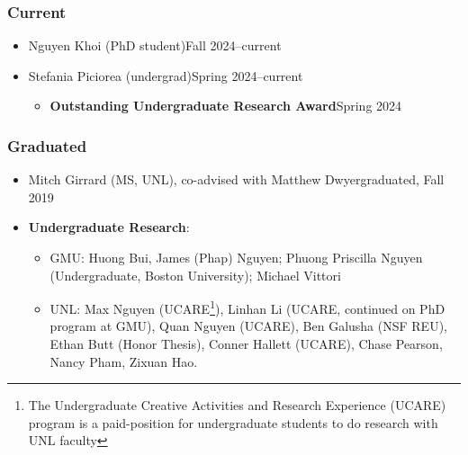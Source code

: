 \documentclass[11pt]{article}
\begin{document}
\newcommand{\nguyenkhoi}{
\item Nguyen Khoi (PhD student)\hfill Fall 2024--current
}

\newcommand{\stefaniapiciorea}{
\item Stefania Piciorea (undergrad)\hfill Spring 2024--current
\begin{itemize}[before=\small]
    \item \textbf{Outstanding Undergraduate Research Award}\hfill Spring 2024
\end{itemize}
}


\subsubsection{Current}
\begin{itemize}
    \habeen{}
    \nguyenkhoi{}
    \longbui{}
    \haiduong{}
    \linhan{}
    \didier{}
    \stefaniapiciorea{}
\end{itemize}

\subsubsection{Graduated}
\begin{itemize}
    \kimhao{}
    \guolong{}
    \alex{}
    \item Mitch Girrard (MS, UNL), co-advised with Matthew Dwyer\hfill graduated, Fall 2019
    
    \item \textbf{Undergraduate Research}:
    \begin{itemize}
        \item GMU: Huong Bui, James (Phap) Nguyen; Phuong Priscilla Nguyen (Undergraduate, Boston University); Michael Vittori
        \item UNL: Max Nguyen (UCARE\footnote{The Undergraduate Creative Activities and Research Experience (UCARE) program is a paid-position for undergraduate students to do research with UNL faculty}), Linhan Li (UCARE, continued on PhD program at GMU), Quan Nguyen (UCARE), Ben Galusha (NSF REU), Ethan Butt (Honor Thesis), Conner Hallett (UCARE), Chase Pearson, Nancy Pham, Zixuan Hao.
    \end{itemize}
\end{itemize}
\end{document}
